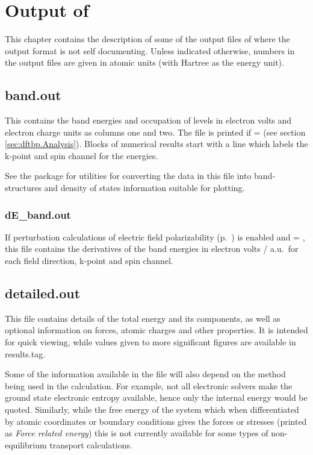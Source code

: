 \chapter{Output of \dftbp}
\label{sec:dftbp.output}

This chapter contains the description of some of the output files of
\dftbp{} where the output format is not self documenting. Unless
indicated otherwise, numbers in the output files are given in atomic
units (with Hartree as the energy unit).

\section{band.out}
\label{sec:dftbp.bandout}

This contains the band energies and occupation of levels in electron volts and
electron charge units as columns one and two. The file is printed if
 =  (see section \ref{sec:dftbp.Analysis}). Blocks of
numerical results start with a line which labels the k-point and spin channel
for the energies.

See the \dptools{} package for utilities for converting the data in this file
into band-structures and density of states information suitable for plotting.

\subsection{dE\_band.out}
\label{sec:dftbp.dEbandout}

If perturbation calculations of electric field polarizability
(p.~) is enabled and  = ,
this file contains the derivatives of the band energies in electron volts /
a.u.\ for each field direction, k-point and spin channel.

\section{detailed.out}
\label{sec:dftbp.detailedout}

This file contains details of the total energy and its components, as well as
optional information on forces, atomic charges and other properties. It is
intended for quick viewing, while values given to more significant figures are
available in results.tag.

Some of the information available in the file will also depend on the method
being used in the calculation. For example, not all electronic solvers make the
ground state electronic entropy available, hence only the internal energy would
be quoted. Similarly, while the free energy of the system which when
differentiated by atomic coordinates or boundary conditions gives the forces or
stresses (printed as \textit{Force related energy}) this is not currently
available for some types of non-equilibrium transport calculations.

